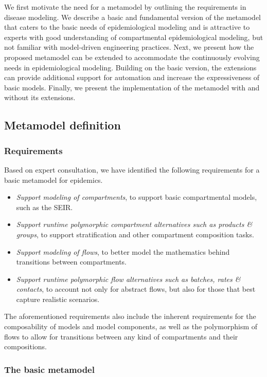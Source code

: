 
We first motivate the need for a metamodel by outlining the requirements in disease modeling. We describe a basic and fundamental version of the metamodel that caters to the basic needs of epidemiological modeling and is attractive to experts with good understanding of compartmental epidemiological modeling, but not familiar with model-driven engineering practices. Next, we present how the proposed metamodel can be extended to accommodate the continuously evolving needs in epidemiological modeling. Building on the basic version, the extensions can provide additional support for automation and increase the expressiveness of basic models. Finally, we present the implementation of the metamodel with and without its extensions.

\subsection{Metamodel definition}

\subsubsection{Requirements}

Based on expert consultation, we have identified the following requirements for a basic metamodel for epidemics.
\begin{itemize}
    \item \emph{Support modeling of compartments}, to support basic compartmental models, such as the SEIR.
    \item \emph{Support runtime polymorphic compartment alternatives such as products \& groups}, to support stratification and other compartment composition tasks.
    \item \emph{Support modeling of flows}, to better model the mathematics behind transitions between compartments.
    \item \emph{Support runtime polymorphic flow alternatives such as batches, rates \& contacts}, to account not only for abstract flows, but also for those that best capture realistic scenarios.
\end{itemize}
The aforementioned requirements also include the inherent requirements for the composability of models and model components, as well as the polymorphism of flows to allow for transitions between any kind of compartments and their compositions.

\subsubsection{The basic metamodel}

